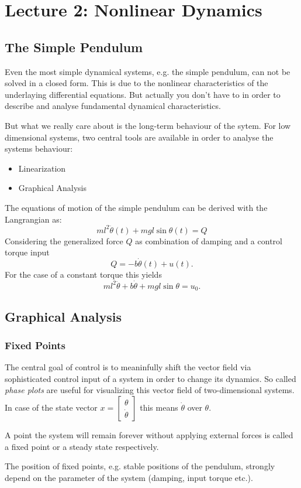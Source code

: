 \chapter{Lecture 2: Nonlinear Dynamics}\label{lecture2}
\section{The Simple Pendulum}
Even the most simple dynamical systems, e.g. the simple pendulum, can not be solved in a closed form. This is due to the nonlinear characteristics of the underlaying differential equations. But actually you don't have to in order to describe and analyse fundamental dynamical characteristics. 

But what we really care about is the long-term behaviour of the sytem. For low dimensional systems, two central tools are available in order to analyse the systems behaviour: 
\begin{itemize}
\item Linearization
\item Graphical Analysis
\end{itemize}
 
The equations of motion of the simple pendulum can be derived with the Langrangian as:
$$ ml^2 \ddot\theta(t) + mgl\sin{\theta(t)} = Q $$ 
Considering the generalized force $Q$ as combination of damping and a control torque input
$$ Q = -b\dot\theta(t) +u(t).$$
For the case of a constant torque this yields
$$ ml^2 \ddot\theta + b\dot\theta + mgl \sin\theta = u_0.$$

\section{Graphical Analysis}
\subsection{Fixed Points}
The central goal of control is to meaninfully shift the vector field via sophisticated control input of a system in order to change its dynamics.  
So called \textit{phase plots} are useful for visualizing this vector field of two-dimensional systems.  In case of the state vector $x= \begin{bmatrix} \theta \\ \dot{\theta} \end{bmatrix}$ this means $\dot{\theta}$ over $\theta$.

\begin{definition}
A point the system will remain forever without applying external forces is called a fixed point or a steady state respectively.
\end{definition}
The position of fixed points, e.g. stable positions of the pendulum, strongly depend on the parameter of the system (damping, input torque etc.). 

